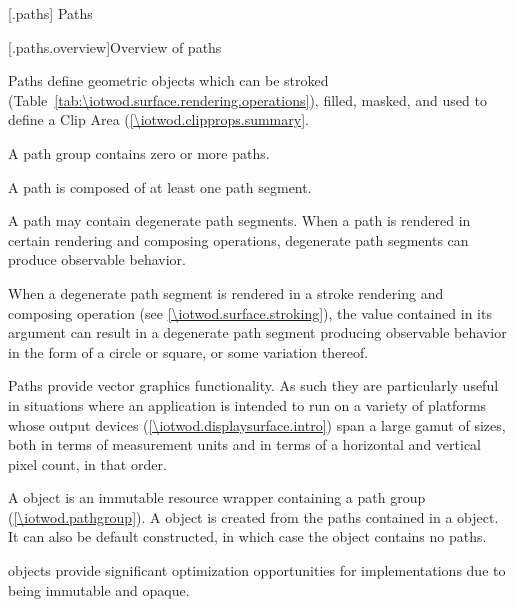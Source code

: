 
 [\iotwod.paths] {Paths}

 [\iotwod.paths.overview]{Overview of paths}

\pnum
Paths define geometric objects which can be stroked (Table~\ref{tab:\iotwod.surface.rendering.operations}), filled, masked, and used to define a Clip Area (\ref{\iotwod.clipprops.summary}.

\pnum
A path group contains zero or more paths.

\pnum
A path is composed of at least one path segment.

\pnum
A path may contain degenerate path segments. When a path is rendered in certain rendering and composing operations, degenerate path segments can produce observable behavior.
\begin{example}
When a degenerate path segment is rendered in a stroke rendering and composing operation (see \ref{\iotwod.surface.stroking}), the  value contained in its  argument can result in a degenerate path segment producing observable behavior in the form of a circle or square, or some variation thereof.
\end{example}

\pnum
Paths provide vector graphics functionality. As such they are particularly useful in situations where an application is intended to run on a variety of platforms whose output devices (\ref{\iotwod.displaysurface.intro}) span a large gamut of sizes, both in terms of measurement units and in terms of a horizontal and vertical pixel count, in that order.
%

\pnum
A  object is an immutable resource wrapper containing a path group (\ref{\iotwod.pathgroup}). A  object is created from the paths contained in a  object. It can also be default constructed, in which case the  object contains no paths.
\begin{note}
 objects provide significant optimization opportunities for implementations due to being immutable and opaque.
\end{note}

